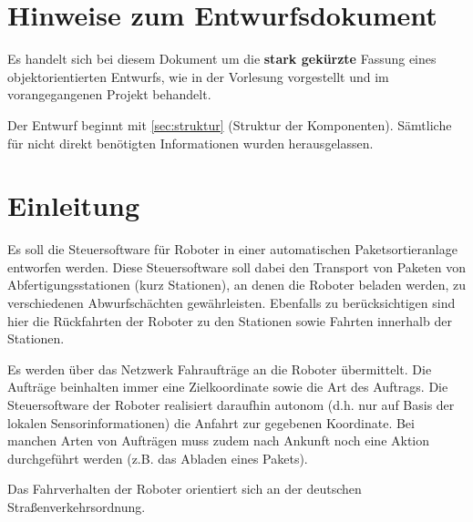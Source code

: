 

\section*{Hinweise zum Entwurfsdokument}

Es handelt sich bei diesem Dokument um die \textbf{stark gekürzte} Fassung eines objektorientierten Entwurfs, wie in der Vorlesung vorgestellt und im vorangegangenen Projekt behandelt. 

Der Entwurf beginnt mit \autoref{sec:struktur} (Struktur der Komponenten).
Sämtliche für \docAssignmentTitle{} nicht direkt benötigten Informationen wurden herausgelassen.




\section*{Einleitung}

Es soll die Steuersoftware für Roboter in einer automatischen Paketsortieranlage entworfen werden.
Diese Steuersoftware soll dabei den Transport von Paketen von Abfertigungsstationen (kurz Stationen), an denen die Roboter beladen werden, zu verschiedenen Abwurfschächten gewährleisten. 
Ebenfalls zu berücksichtigen sind hier die Rückfahrten der Roboter zu den Stationen sowie Fahrten innerhalb der Stationen. 

Es werden über das Netzwerk Fahraufträge an die Roboter übermittelt. 
Die Aufträge beinhalten immer eine Zielkoordinate sowie die Art des Auftrags.
Die Steuersoftware der Roboter realisiert daraufhin autonom (d.h. nur auf Basis der lokalen Sensorinformationen) die Anfahrt zur gegebenen Koordinate.
Bei manchen Arten von Aufträgen muss zudem nach Ankunft noch eine Aktion durchgeführt werden (z.B. das Abladen eines Pakets).

Das Fahrverhalten der Roboter orientiert sich an der deutschen Straßenverkehrsordnung.




